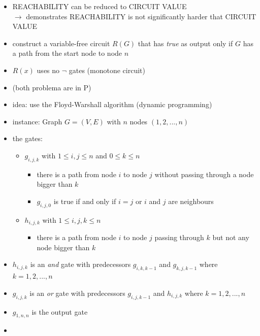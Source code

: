 \documentclass[a4]{scrartcl}
\begin{document}
\begin{itemize}
\item REACHABILITY can be reduced to CIRCUIT VALUE \\
$\rightarrow$ demonstrates REACHABILITY is not significantly harder that CIRCUIT VALUE
\item construct a variable-free circuit $R(G)$ that has \textit{true} as output only if $G$ has a path from the start node to node $n$ 
\item $R(x)$ uses no $\lnot$ gates (monotone circuit) 
\item (both problema are in P)
\item idea: use the Floyd-Warshall algorithm (dynamic programming)
\item instance: Graph $G = (V, E)$ with $n$ nodes $(1,2,...,n)$

\item the gates:
\begin{itemize}
\item $g_{i,j,k}$ with $1 \leq i, j \leq n$ and $0 \leq k \leq n$
\begin{itemize}
\item there is a path from node $i$ to node $j$ without passing through a node bigger than $k$
\item $g_{i,j,0}$ is true if and only if $i=j$ or $i$ and $j$ are neighbours
\end{itemize}
\item $h_{i,j,k}$ with $1 \leq i, j, k \leq n$
\begin{itemize}
\item there is a path from node $i$ to node $j$ passing through $k$ but not any node bigger than $k$
\end{itemize}

\end{itemize}

\item $h_{i,j,k}$ is an \textit{and} gate with predecessors $g_{i, k, k-1}$ and $g_{k, j, k-1}$ where $k= 1, 2, ..., n$
\item $g_{i, j, k}$ is an \textit{or} gate with predecessors $g_{i, j, k-1}$ and $h_{i, j, k}$ where $k = 1, 2, ... , n$
\item $g_{1,n,n}$ is the output gate


\item [] \cite{RCV}



\end{itemize}
\end{document}
